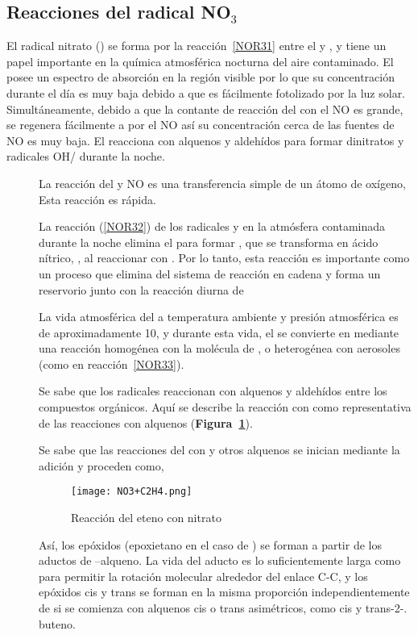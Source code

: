 {\subsection{Reacciones del radical NO$_3$}
El radical nitrato () se forma por la reacción~\ref{NOR31} entre el  y ,  y tiene un papel importante en la química atmosférica nocturna del aire contaminado. El  posee un espectro de absorción en la región visible por lo que su concentración durante el día es muy baja debido a que es fácilmente fotolizado por la luz solar. Simultáneamente, debido a que la contante de reacción del  con el NO es grande, se regenera fácilmente a  por el NO así su concentración cerca de las fuentes de NO es muy baja. El  reacciona con alquenos y aldehídos para formar dinitratos y radicales OH/ durante la noche. 
\begin{description}
\item[ ] 
La reacción del   y NO es una transferencia simple de un átomo de oxígeno,
Esta reacción es rápida.
\item[ ] 
La reacción  (\ref{NOR32}) de los radicales   y   en la atmósfera contaminada durante la noche elimina el   para formar , que se transforma en ácido nítrico, , al reaccionar con . Por lo tanto, esta reacción es importante como un proceso que elimina   del sistema de reacción en cadena y forma un reservorio  junto con la reacción diurna de 

La vida atmosférica del   a temperatura ambiente y presión atmosférica es de aproximadamente 10\second, y durante esta vida, el  se convierte en  mediante una reacción homogénea con la molécula de  , o heterogénea con aerosoles (como en reacción~\ref{NOR33}).
\item[ ] 
Se sabe que los radicales  reaccionan con alquenos y aldehídos entre los compuestos orgánicos. Aquí se describe la reacción con  como representativa de las reacciones con alquenos (\textbf{Figura~\ref{no3c2h4}}).

Se sabe que las reacciones del  con  y otros alquenos se inician mediante la adición y proceden como,
\begin{figure}[htbp]
\begin{center}
\texttt{[image: NO3+C2H4.png]}
\caption{Reacción del eteno con nitrato}
\label{no3c2h4}
\end{center}
\end{figure}
Así, los epóxidos (epoxietano en el caso de ) se forman a partir de los aductos de --alqueno. La vida del aducto es lo suficientemente larga como para permitir la rotación molecular alrededor del enlace C-C, y los epóxidos cis y trans se forman en la misma proporción independientemente de si se comienza con alquenos cis o trans asimétricos, como cis y trans-2-. buteno.


\end{description}}
